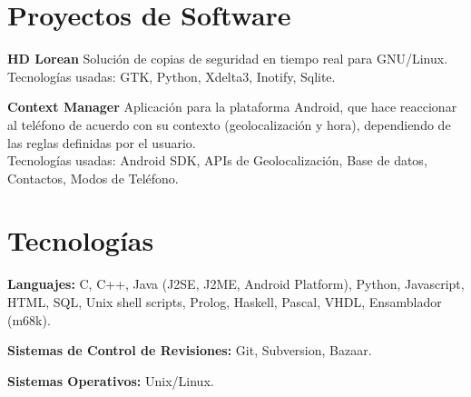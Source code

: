 \documentclass[margin,line]{resume}
\begin{document}
\begin{resume}
\section{\sc Proyectos de Software } 
\begin{list1}
\item[] {\bf HD Lorean}
Solución de copias de seguridad en tiempo real para GNU/Linux.\\
Tecnologías usadas: GTK, Python, Xdelta3, Inotify, Sqlite.\\

\item[] {\bf Context Manager}
Aplicación para la plataforma Android, que hace reaccionar al teléfono 
de acuerdo con su contexto (geolocalización y hora), dependiendo de las reglas definidas por el usuario.\\
Tecnologías usadas: Android SDK, APIs de Geolocalización, Base de datos,
Contactos, Modos de Teléfono.
\end{list1}

\section{\sc Tecnologías} 
\begin{list2}
\item {\bf Languajes:} C, C++, Java (J2SE, J2ME, Android Platform), Python,
Javascript, HTML, SQL, Unix shell scripts, Prolog, Haskell, Pascal, VHDL,
Ensamblador (m68k).
\item {\bf Sistemas de Control de Revisiones:} Git, Subversion, Bazaar.
\item {\bf Sistemas Operativos:} Unix/Linux. 
\end{list2}


\end{resume}
\end{document}
